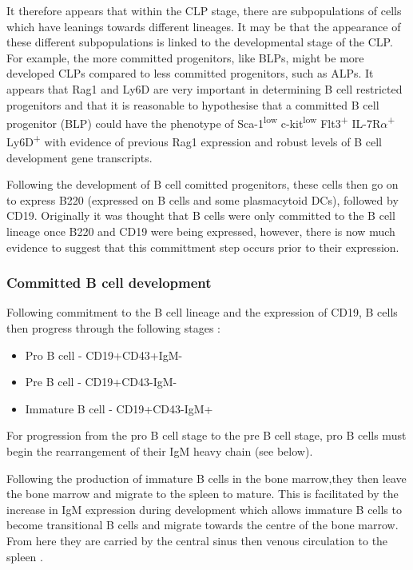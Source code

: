 It therefore appears that within the CLP stage, there are subpopulations of cells which have leanings towards different lineages.
It may be that the appearance of these different subpopulations is linked to the developmental stage of the CLP.
For example, the more committed progenitors, like BLPs, might be more developed CLPs compared to less committed progenitors, such as ALPs.
It appears that Rag1 and Ly6D are very important in determining B cell restricted progenitors and that it is reasonable to hypothesise that a committed B cell progenitor (BLP) could have the phenotype of Sca-1\textsuperscript{low} c-kit\textsuperscript{low} Flt3\textsuperscript{+} IL-7R$\alpha$\textsuperscript{+} Ly6D\textsuperscript{+} with evidence of previous Rag1 expression and robust levels of B cell development gene transcripts.

Following the development of B cell comitted progenitors, these cells then go on to express B220 (expressed on B cells and some plasmacytoid DCs), followed by CD19.
Originally it was thought that B cells were only committed to the B cell lineage once B220 and CD19 were being expressed, however, there is now much evidence to suggest that this committment step occurs prior to their expression.


\subsubsection{Committed B cell development}
\label{subsubsec:committedBcelldevelopment}

Following commitment to the B cell lineage and the expression of CD19, B cells then progress through the following stages \citep{Cambier2007}:
\begin{itemize}
\item Pro B cell - CD19+CD43+IgM-
\item Pre B cell - CD19+CD43-IgM-
\item Immature B cell - CD19+CD43-IgM+
\end{itemize}

For progression from the pro B cell stage to the pre B cell stage, pro B cells must begin the rearrangement of their IgM heavy chain (see below).

Following the production of immature B cells in the bone marrow,they then leave the bone marrow and migrate to the spleen to mature.
This is facilitated by the increase in IgM expression during development which allows immature B cells to become transitional B cells and migrate towards the centre of the bone marrow. 
From here they are carried by the central sinus then venous circulation to the spleen \citep{Loder1999}.


